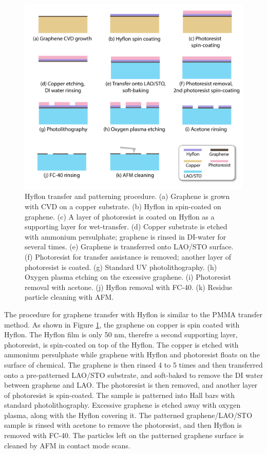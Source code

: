 \documentclass[pdflatex, sectionletters, 12pt]{pittetd}    %
\begin{document}
\begin{figure}[p]
	\centering
	\includegraphics[width=1.0\textwidth]{Drawing/HyflonTransfer.pdf}
	\caption{Hyflon transfer and patterning procedure. (a) Graphene is grown with CVD on a copper substrate. (b) Hyflon in spin-coated on graphene. (c) A layer of photoresist is coated on Hyflon as a supporting layer for wet-transfer. (d) Copper substrate is etched with ammonium persulphate; graphene is rinsed in DI-water for several times. (e) Graphene is transferred onto LAO/STO surface. (f) Photoresist for transfer assistance is removed; another layer of photoresist is coated. (g) Standard UV photolithography. (h) Oxygen plasma etching on the excessive graphene. (i) Photoresist removal with acetone. (j) Hyflon removal with FC-40. (k) Residue particle cleaning with AFM.}
	\label{FIG:HyflonTransfer}
\end{figure}

The procedure for graphene transfer with Hyflon is similar to the PMMA transfer method. As shown in Figure \ref{FIG:HyflonTransfer}, the graphene on copper is spin coated with Hyflon. The Hyflon film is only 50 nm, therefre a second supporting layer, photoresist, is spin-coated on top of the Hyflon. The copper is etched with ammonium persulphate while graphene with Hyflon and photoresist floats on the surface of chemical. The graphene is then rinsed 4 to 5 times and then transferred onto a pre-patterned LAO/STO substrate, and soft-baked to remove the DI water between graphene and LAO. The photoresist is then removed, and another layer of photoresist is spin-coated. The sample is patterned into Hall bars with standard photolithography. Excessive graphene is etched away with oxygen plasma, along with the Hyflon covering it. The patterned graphene/LAO/STO sample is rinsed with acetone to remove the photoresist, and then Hyflon is removed with FC-40. The particles left on the patterned graphene surface is cleaned by AFM in contact mode scans. 
\end{document}
